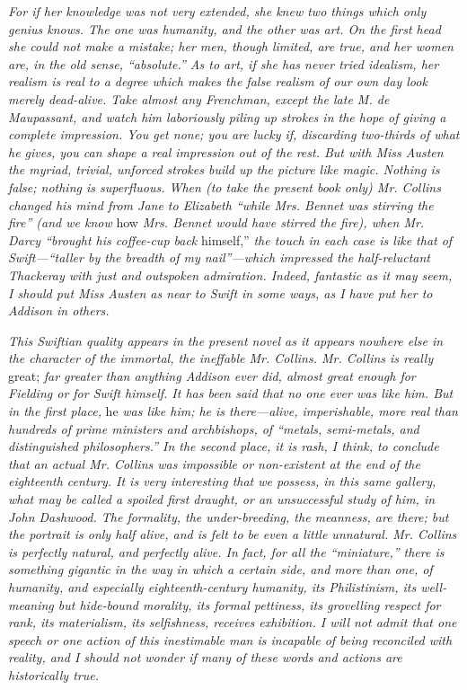 \documentclass[12pt]{book}
\begin{document}
\textit{For if her knowledge was not very extended, she knew two things which only genius knows. The one was humanity, and the other was art. On the first head she could not make a mistake; her men, though limited, are true, and her women are, in the old sense, ``absolute.'' As to art, if she has never tried idealism, her realism is real to a degree which makes the false realism of our own day look merely dead-alive. Take almost any Frenchman, except the late M. de Maupassant, and watch him laboriously piling up strokes in the hope of giving a complete impression. You get none; you are lucky if, discarding two-thirds of what he gives, you can shape a real impression out of the rest. But with Miss Austen the myriad, trivial, unforced strokes build up the picture like magic. Nothing is false; nothing is superfluous. When (to take the present book only) Mr. Collins changed his mind from Jane to Elizabeth ``while Mrs. Bennet was stirring the fire'' (and we know} how \textit{Mrs. Bennet would have stirred the fire), when Mr. Darcy ``brought his coffee-cup back} himself,'' \textit{the touch in each case is like that of Swift---``taller by the breadth of my nail''---which impressed the half-reluctant Thackeray with just and outspoken admiration. Indeed, fantastic as it may seem, I should put Miss Austen as near to Swift in some ways, as I have put her to Addison in others.}

\textit{This Swiftian quality appears in the present novel as it appears nowhere else in the character of the immortal, the ineffable Mr. Collins. Mr. Collins is really} great; \textit{far greater than anything Addison ever did, almost great enough for Fielding or for Swift himself. It has been said that no one ever was like him. But in the first place,} he \textit{was like him; he is there---alive, imperishable, more real than hundreds of prime ministers and archbishops, of ``metals, semi-metals, and distinguished philosophers.'' In the second place, it is rash, I think, to conclude that an actual Mr. Collins was impossible or non-existent at the end of the eighteenth century. It is very interesting that we possess, in this same gallery, what may be called a spoiled first draught, or an unsuccessful study of him, in John Dashwood. The formality, the under-breeding, the meanness, are there; but the portrait is only half alive, and is felt to be even a little unnatural. Mr. Collins is perfectly natural, and perfectly alive. In fact, for all the ``miniature,'' there is something gigantic in the way in which a certain side, and more than one, of humanity, and especially eighteenth-century humanity, its Philistinism, its well-meaning but hide-bound morality, its formal pettiness, its grovelling respect for rank, its materialism, its selfishness, receives exhibition. I will not admit that one speech or one action of this inestimable man is incapable of being reconciled with reality, and I should not wonder if many of these words and actions are historically true.}
\end{document}
